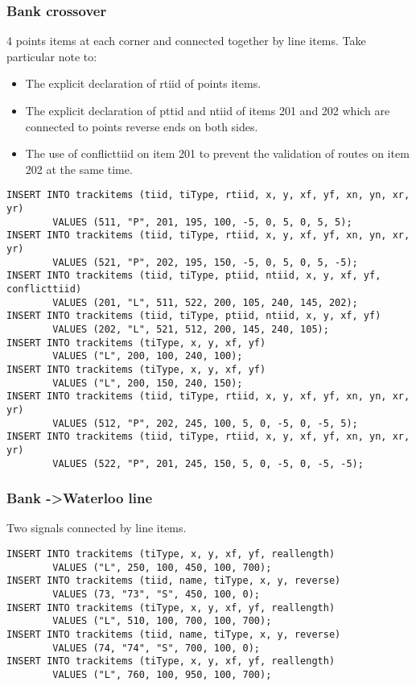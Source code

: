 \documentclass[12pt,a4paper]{article}
\begin{document}
\subsubsection{Bank crossover}
4 points items at each corner and connected together by line items. Take particular note to:
\begin{itemize}
 \item The explicit declaration of rtiid of points items.
 \item The explicit declaration of pttid and ntiid of items 201 and 202 which are connected to points reverse ends on both sides.
 \item The use of conflicttiid on item 201 to prevent the validation of routes on item 202 at the same time.
\end{itemize}

\begin{verbatim}
INSERT INTO trackitems (tiid, tiType, rtiid, x, y, xf, yf, xn, yn, xr, yr)
        VALUES (511, "P", 201, 195, 100, -5, 0, 5, 0, 5, 5);
INSERT INTO trackitems (tiid, tiType, rtiid, x, y, xf, yf, xn, yn, xr, yr)
        VALUES (521, "P", 202, 195, 150, -5, 0, 5, 0, 5, -5);
INSERT INTO trackitems (tiid, tiType, ptiid, ntiid, x, y, xf, yf, conflicttiid)
        VALUES (201, "L", 511, 522, 200, 105, 240, 145, 202);
INSERT INTO trackitems (tiid, tiType, ptiid, ntiid, x, y, xf, yf)
        VALUES (202, "L", 521, 512, 200, 145, 240, 105);
INSERT INTO trackitems (tiType, x, y, xf, yf)
        VALUES ("L", 200, 100, 240, 100);
INSERT INTO trackitems (tiType, x, y, xf, yf)
        VALUES ("L", 200, 150, 240, 150);
INSERT INTO trackitems (tiid, tiType, rtiid, x, y, xf, yf, xn, yn, xr, yr) 
        VALUES (512, "P", 202, 245, 100, 5, 0, -5, 0, -5, 5);
INSERT INTO trackitems (tiid, tiType, rtiid, x, y, xf, yf, xn, yn, xr, yr) 
        VALUES (522, "P", 201, 245, 150, 5, 0, -5, 0, -5, -5);
\end{verbatim}

\subsubsection{Bank -\textgreater Waterloo line}
Two signals connected by line items.
\begin{verbatim}
INSERT INTO trackitems (tiType, x, y, xf, yf, reallength)
        VALUES ("L", 250, 100, 450, 100, 700);
INSERT INTO trackitems (tiid, name, tiType, x, y, reverse)
        VALUES (73, "73", "S", 450, 100, 0);
INSERT INTO trackitems (tiType, x, y, xf, yf, reallength)
        VALUES ("L", 510, 100, 700, 100, 700);
INSERT INTO trackitems (tiid, name, tiType, x, y, reverse)
        VALUES (74, "74", "S", 700, 100, 0);
INSERT INTO trackitems (tiType, x, y, xf, yf, reallength)
        VALUES ("L", 760, 100, 950, 100, 700);
\end{verbatim}
\end{document}
